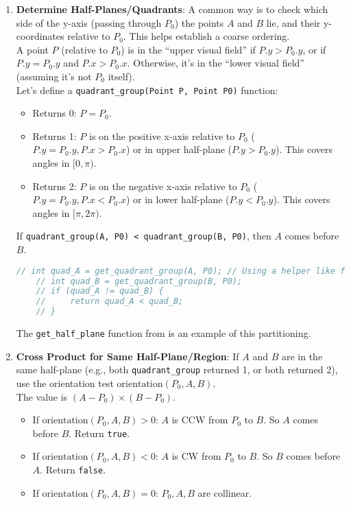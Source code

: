 \begin{openquestion}
\begin{enumerate}
    \item \textbf{Determine Half-Planes/Quadrants}: A common way is to check which side of the y-axis (passing through $P_0$) the points $A$ and $B$ lie, and their y-coordinates relative to $P_0$. This helps establish a coarse ordering. \\
    A point $P$ (relative to $P_0$) is in the ``upper visual field'' if $P.y > P_0.y$, or if $P.y = P_0.y$ and $P.x > P_0.x$. Otherwise, it's in the ``lower visual field'' (assuming it's not $P_0$ itself). \\
    Let's define a \texttt{quadrant\_group(Point P, Point P0)} function:
    \begin{itemize}
        \item Returns 0: $P = P_0$.
        \item Returns 1: $P$ is on the positive x-axis relative to $P_0$ ($P.y = P_0.y, P.x > P_0.x$) or in upper half-plane ($P.y > P_0.y$). This covers angles in $[0, \pi)$.
        \item Returns 2: $P$ is on the negative x-axis relative to $P_0$ ($P.y = P_0.y, P.x < P_0.x$) or in lower half-plane ($P.y < P_0.y$). This covers angles in $[\pi, 2\pi)$.
    \end{itemize}
    If \texttt{quadrant\_group(A, P0) < quadrant\_group(B, P0)}, then $A$ comes before $B$.

    \begin{lstlisting}[language=C++]
    // int quad_A = get_quadrant_group(A, P0); // Using a helper like from Impl A.4.2
    // int quad_B = get_quadrant_group(B, P0);
    // if (quad_A != quad_B) {
    //     return quad_A < quad_B;
    // }
    \end{lstlisting}
    The \texttt{get\_half\_plane} function from  is an example of this partitioning.

    \item \textbf{Cross Product for Same Half-Plane/Region}: If $A$ and $B$ are in the same half-plane (e.g., both \texttt{quadrant\_group} returned 1, or both returned 2), use the orientation test $\text{orientation}(P_0, A, B)$. \\
    The value is $(A-P_0) \times (B-P_0)$.
    \begin{itemize}
        \item If $\text{orientation}(P_0, A, B) > 0$: $A$ is CCW from $P_0$ to $B$. So $A$ comes before $B$. Return \texttt{true}.
        \item If $\text{orientation}(P_0, A, B) < 0$: $A$ is CW from $P_0$ to $B$. So $B$ comes before $A$. Return \texttt{false}.
        \item If $\text{orientation}(P_0, A, B) = 0$: $P_0, A, B$ are collinear.
    \end{itemize}


\end{enumerate}
\end{openquestion}

